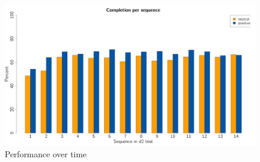 \documentclass[	
	12pt, %
	a4paper, %
  abstracton
]{scrartcl}\usepackage[]{graphicx}\usepackage[]{color}
\newenvironment{knitrout}{}{} %
\begin{document}
\begin{knitrout}\footnotesize
{}\color{fgcolor}\begin{figure}[]


{\centering \includegraphics[width=1\linewidth]{figure/beamer-completed_sets} 

}

\caption[Performance over time]{Performance over time\label{fig:completed_sets}}
\end{figure}


\end{knitrout}
\end{document}
